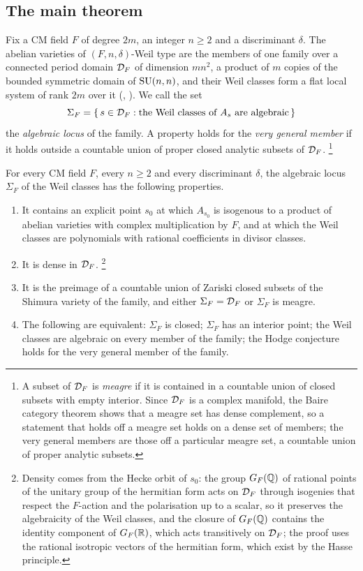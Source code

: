 \subsection{The main theorem}

Fix a CM field $F$ of degree $2m$, an integer $n\ge2$ and a discriminant
$\delta$. The abelian varieties of $(F,n,\delta)$-Weil type are the members of
one family over a connected period domain $\mathcal{D}_{F}$ of dimension $mn^{2}$, a
product of $m$ copies of the bounded symmetric domain of $\operatorname{SU}(n,n)$, and their
Weil classes form a flat local system of rank $2m$ over it
(, ). We call the set
\[
  \Sigma_{F}=\{\,s\in\mathcal{D}_{F}:\text{the Weil classes of }A_{s}\text{ are
  algebraic}\,\}
\]
the \emph{algebraic locus} of the family. A property holds for the
\emph{very general member} if it holds outside a countable union of proper
closed analytic subsets of $\mathcal{D}_{F}$.%
\footnote{A subset of $\mathcal{D}_{F}$ is \emph{meagre} if it is contained in a
countable union of closed subsets with empty interior. Since $\mathcal{D}_{F}$ is a
complex manifold, the Baire category theorem shows that a meagre set has
dense complement, so a statement that holds off a meagre set holds on a dense
set of members; the very general members are those off a particular meagre
set, a countable union of proper analytic subsets.}

\begin{theorem}\label{thm:main}
For every CM field $F$, every $n\ge2$ and every discriminant $\delta$, the
algebraic locus $\Sigma_{F}$ of the Weil classes has the following
properties.
\begin{enumerate}[label=\textup{(\roman*)},leftmargin=2.6em,itemsep=2pt]
\item It contains an explicit point $s_{0}$ at which $A_{s_{0}}$ is isogenous
  to a product of abelian varieties with complex multiplication by $F$, and
  at which the Weil classes are polynomials with rational coefficients in
  divisor classes.
\item It is dense in $\mathcal{D}_{F}$.%
\footnote{Density comes from the Hecke orbit of $s_{0}$: the group
$G_{F}(\mathbb{Q})$ of rational points of the unitary group of the hermitian form
acts on $\mathcal{D}_{F}$ through isogenies that respect the $F$-action and the
polarisation up to a scalar, so it preserves the algebraicity of the Weil
classes, and the closure of $G_{F}(\mathbb{Q})$ contains the identity component of
$G_{F}(\mathbb{R})$, which acts transitively on $\mathcal{D}_{F}$; the proof uses the
rational isotropic vectors of the hermitian form, which exist by the Hasse
principle.}
\item It is the preimage of a countable union of Zariski closed subsets of the
  Shimura variety of the family, and either $\Sigma_{F}=\mathcal{D}_{F}$ or
  $\Sigma_{F}$ is meagre.
\item The following are equivalent: $\Sigma_{F}$ is closed; $\Sigma_{F}$ has
  an interior point; the Weil classes are algebraic on every member of the
  family; the Hodge conjecture holds for the very general member of the
  family.
\end{enumerate}
\end{theorem}

